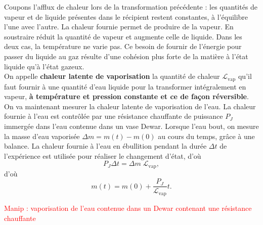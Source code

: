 \documentclass[11pt,a4paper]{report}
\begin{document}
Coupons l'afflux de chaleur lors de la transformation précédente : les quantités de vapeur et de liquide présentes dans le récipient restent constantes, à l'équilibre l'une avec l'autre. La chaleur fournie permet de produire de la vapeur. En soustraire réduit la quantité de vapeur et augmente celle de liquide. Dans les deux cas, la température ne varie pas. Ce besoin de fournir de l'énergie pour passer du liquide au gaz résulte d'une cohésion plus forte de la matière à l'état liquide qu'à l'état gazeux.\\

On appelle \textbf{chaleur latente de vaporisation} la quantité de chaleur $\mathcal{L}_\text{vap}$ qu'il faut fournir à une quantité d'eau liquide pour la transformer intégralement en vapeur, \textbf{à température et pression constante et ce de façon réversible}.\\

On va maintenant mesurer la chaleur latente de vaporisation de l'eau. La chaleur fournie à l'eau est contrôlée par une résistance chauffante de puissance $P_J$ immergée dans l'eau contenue dans un vase Dewar. Lorsque l'eau bout, on mesure la masse d'eau vaporisée $\Delta m = m(t) - m(0)$ au cours du temps, grâce à une balance. La chaleur fournie à l'eau en ébullition pendant la durée $\Delta t$ de l'expérience est utilisée pour réaliser le changement d'état, d'où
\begin{equation}
	P_J \Delta t = \Delta m \;\mathcal{L}_\text{vap},
\end{equation}
d'où
\begin{equation}
	\boxed{m(t) = m(0) + \frac{P_J}{\mathcal{L}_\text{vap}}t}.
\end{equation}

\textcolor{red}{Manip : vaporisation de l'eau contenue dans un Dewar contenant une résistance chauffante}
\end{document}
